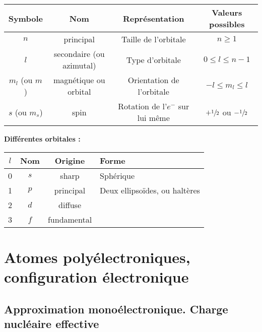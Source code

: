 \documentclass[13pt, twoside, a4paper, french, tikz]{report}
\begin{document}
    \begin{tabular}{|c|c|c|c|}
        \hline
        \textbf{Symbole} & \textbf{Nom}             & \textbf{Représentation}          & \textbf{Valeurs possibles}         \\\hline
        $n$              & principal                & Taille de l'orbitale             & $n \ge 1$                          \\\hline
        $l$              & secondaire (ou azimutal) & Type d'orbitale                  & $0 \le l \le n-1$                  \\\hline
        $m_l$ (ou $m$)   & magnétique ou orbital    & Orientation de l'orbitale        & $-l \le m_l \le l$                 \\\hline
        $s$ (ou $m_s$)   & spin                     & Rotation de l'$e^-$ sur lui même & $+\sfrac{1}{2}$ ou $-\sfrac{1}{2}$ \\\hline
    \end{tabular}\label{tab:table}

    \vspace{7pt}
    \textbf{Différentes orbitales :}
    \vspace{7pt}

    \begin{tabular}{|c|c|c|l|}
        \hline
        \textbf{$l$} & \textbf{Nom} & \textbf{Origine} & \textbf{Forme}                \\\hline
        0            & $s$          & sharp            & Sphérique                     \\\hline
        1            & $p$          & principal        & Deux ellipsoïdes, ou haltères \\\hline
        2            & $d$          & diffuse          &                               \\\hline
        3            & $f$          & fundamental      &                               \\\hline
    \end{tabular}


    \chapter{Atomes polyélectroniques,\\configuration électronique}\label{ch:atomes-polyelectroniques---configuration-electronique}


    \section{Approximation monoélectronique. Charge nucléaire effective}\label{sec:approximation-monoelectronique.-charge-nucleaire-effective}
\end{document}
